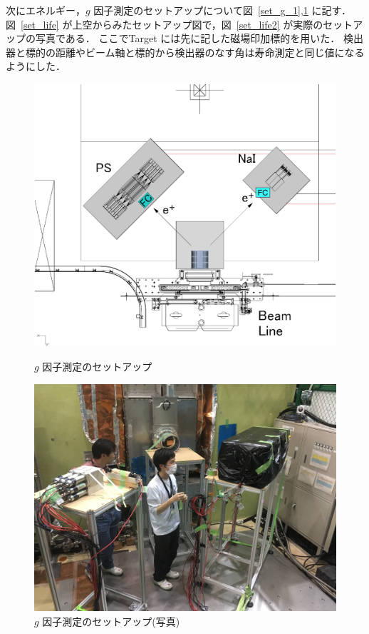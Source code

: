 次にエネルギー，$g$ 因子測定のセットアップについて図~\ref{set_g_1},\ref{set_g_2} に記す．
図~\ref{set_life} が上空からみたセットアップ図で，図~\ref{set_life2} が実際のセットアップの写真である．
ここでTarget には先に記した磁場印加標的を用いた．
検出器と標的の距離やビーム軸と標的から検出器のなす角は寿命測定と同じ値になるようにした．
\begin{figure}[H]
  \begin{minipage}{0.45\hsize}
    \begin{center}
      \includegraphics[width=1\textwidth]{figure/tajima/g-2_3.png}
      \caption{$g$ 因子測定のセットアップ}
      \label{set_g_1}
    \end{center}
  \end{minipage}
  \begin{minipage}{0.45\hsize}
    \begin{center}
      \includegraphics[width=1.1\textwidth]{figure/tajima/g.jpg}
      \caption{$g$ 因子測定のセットアップ(写真)}
      \label{set_g_2}
    \end{center}
  \end{minipage}
\end{figure}
